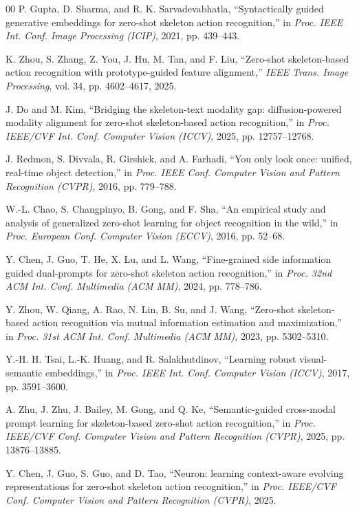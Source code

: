 \documentclass[conference]{IEEEtran}
\begin{document}
\begin{thebibliography}{00}
P. Gupta, D. Sharma, and R. K. Sarvadevabhatla,
``Syntactically guided generative embeddings for zero-shot skeleton action recognition,''
in \textit{Proc. IEEE Int. Conf. Image Processing (ICIP)}, 2021, pp. 439--443.

K. Zhou, S. Zhang, Z. You, J. Hu, M. Tan, and F. Liu,
``Zero-shot skeleton-based action recognition with prototype-guided feature alignment,''
\textit{IEEE Trans. Image Processing}, vol. 34, pp. 4602--4617, 2025.

J. Do and M. Kim,
``Bridging the skeleton-text modality gap: diffusion-powered modality alignment for zero-shot skeleton-based action recognition,''
in \textit{Proc. IEEE/CVF Int. Conf. Computer Vision (ICCV)}, 2025, pp. 12757--12768.

J. Redmon, S. Divvala, R. Girshick, and A. Farhadi,
``You only look once: unified, real-time object detection,''
in \textit{Proc. IEEE Conf. Computer Vision and Pattern Recognition (CVPR)}, 2016, pp. 779--788.

W.-L. Chao, S. Changpinyo, B. Gong, and F. Sha,
``An empirical study and analysis of generalized zero-shot learning for object recognition in the wild,''
in \textit{Proc. European Conf. Computer Vision (ECCV)}, 2016, pp. 52--68.

Y. Chen, J. Guo, T. He, X. Lu, and L. Wang,
``Fine-grained side information guided dual-prompts for zero-shot skeleton action recognition,''
in \textit{Proc. 32nd ACM Int. Conf. Multimedia (ACM MM)}, 2024, pp. 778--786.

Y. Zhou, W. Qiang, A. Rao, N. Lin, B. Su, and J. Wang,
``Zero-shot skeleton-based action recognition via mutual information estimation and maximization,''
in \textit{Proc. 31st ACM Int. Conf. Multimedia (ACM MM)}, 2023, pp. 5302--5310.

Y.-H. H. Tsai, L.-K. Huang, and R. Salakhutdinov,
``Learning robust visual-semantic embeddings,''
in \textit{Proc. IEEE Int. Conf. Computer Vision (ICCV)}, 2017, pp. 3591--3600.

A. Zhu, J. Zhu, J. Bailey, M. Gong, and Q. Ke,
``Semantic-guided cross-modal prompt learning for skeleton-based zero-shot action recognition,''
in \textit{Proc. IEEE/CVF Conf. Computer Vision and Pattern Recognition (CVPR)}, 2025, pp. 13876--13885.

Y. Chen, J. Guo, S. Guo, and D. Tao,
``Neuron: learning context-aware evolving representations for zero-shot skeleton action recognition,''
in \textit{Proc. IEEE/CVF Conf. Computer Vision and Pattern Recognition (CVPR)}, 2025.


\end{thebibliography}
\end{document}

